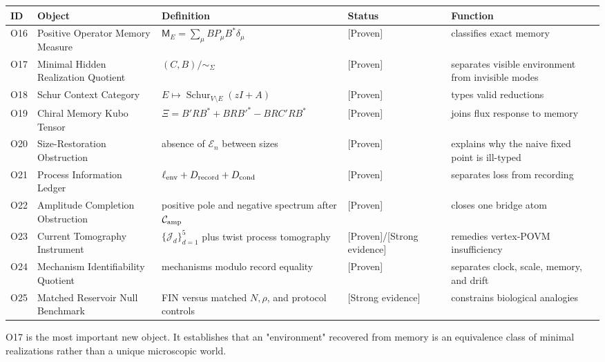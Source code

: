 \documentclass[11pt,a4paper,openany]{report}
\newcommand{\statusProven}{\textcolor{fingreen}{[Proven]}}
\newcommand{\statusStrong}{\textcolor{finblue}{[Strong evidence]}}
\begin{document}
\begin{center}
\begingroup\fontsize{7}{8.4}\selectfont
\setlength{\tabcolsep}{2.5pt}
\renewcommand{\arraystretch}{1.16}
\begin{longtable}{@{}p{}p{}p{}p{}p{}@{}}
\toprule
\textbf{ID} & \textbf{Object} & \textbf{Definition} & \textbf{Status} & \textbf{Function} \\
\midrule
\endhead
O16 & Positive Operator Memory Measure & \(\mathsf M_E=\sum_\mu BP_\mu B^\ast\delta_\mu\) & \statusProven{} & classifies exact memory \\
O17 & Minimal Hidden Realization Quotient & \((C,B)/{\sim_\Sigma}\) & \statusProven{} & separates visible environment from invisible modes \\
O18 & Schur Context Category & \(E\mapsto\operatorname{Schur}_{V\setminus E}(zI+A)\) & \statusProven{} & types valid reductions \\
O19 & Chiral Memory Kubo Tensor & \(\Xi=B'RB^\ast+BRB'^\ast-BRC'RB^\ast\) & \statusProven{} & joins flux response to memory \\
O20 & Size-Restoration Obstruction & absence of \(\mathcal E_n\) between sizes & \statusProven{} & explains why the naive fixed point is ill-typed \\
O21 & Process Information Ledger & \(\ell_{\rm env}+D_{\rm record}+D_{\rm cond}\) & \statusProven{} & separates loss from recording \\
O22 & Amplitude Completion Obstruction & positive pole and negative spectrum after \(\mathcal C_{\rm amp}\) & \statusProven{} & closes one bridge atom \\
O23 & Current Tomography Instrument & \(\{\mathcal J_d\}_{d=1}^5\) plus twist process tomography & \statusProven{}/\allowbreak{}\statusStrong{} & remedies vertex-POVM insufficiency \\
O24 & Mechanism Identifiability Quotient & mechanisms modulo record equality & \statusProven{} & separates clock, scale, memory, and drift \\
O25 & Matched Reservoir Null Benchmark & FIN versus matched \(N,\rho\), and protocol controls & \statusStrong{} & constrains biological analogies \\
\bottomrule
\end{longtable}
\endgroup
\end{center}

O17 is the most important new object. It establishes that an "environment" recovered from memory is an equivalence class of minimal realizations rather than a unique microscopic world.
\end{document}

